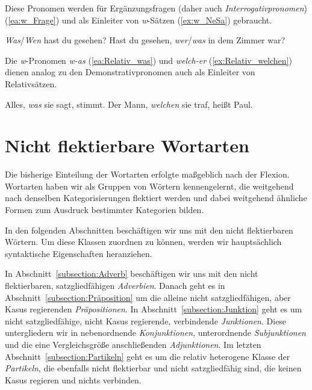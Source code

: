 Diese Pronomen werden für Ergänzungsfragen (daher auch \textit{Interrogativpronomen}) (\ref{ea:w_Frage}) und als Einleiter von \textit{w}-Sätzen (\ref{ex:w_NeSa}) gebraucht.

\ea \label{ea:w_Frage_NeSa}
\ea \label{ea:w_Frage} \textit{Was}/\textit{Wen} hast du gesehen?
\ex \label{ex:w_NeSa} Hast du gesehen, \textit{wer}/\textit{was} in dem Zimmer war?
\z 
\z 

Die \textit{w}-Pronomen \textit{w-as} (\ref{ea:Relativ_was}) und \textit{welch-er} (\ref{ex:Relativ_welchen}) dienen analog zu den Demonstrativpronomen auch als Einleiter von Relativsätzen. 

\ea \label{ea:Relativ_w_d}
\ea \label{ea:Relativ_was} Alles, \textit{was} sie sagt, stimmt.
\ex \label{ex:Relativ_welchen} Der Mann, \textit{welchen} sie traf, heißt Paul.
\z 
\z 



\section{Nicht flektierbare Wortarten}\label{section:Nicht flektierbar}

Die bisherige Einteilung der Wortarten erfolgte maßgeblich nach der Flexion. Wortarten haben wir als Gruppen von Wörtern kennengelernt, die weitgehend nach denselben Kategorisierungen flektiert werden und dabei weitgehend ähnliche Formen zum Ausdruck bestimmter Kategorien bilden.

In den folgenden Abschnitten beschäftigen wir uns mit den nicht flektierbaren Wörtern. Um diese Klassen zuordnen zu können, werden wir hauptsächlich syntaktische Eigenschaften heranziehen. 

In Abschnitt~\ref{subsection:Adverb} beschäftigen wir uns mit den nicht flektierbaren, satzgliedfähigen \textit{Adverbien}. Danach geht es in Abschnitt~\ref{subsection:Präposition} um die alleine nicht satzgliedfähigen, aber Kasus regierenden \textit{Präpositionen}. In Abschnitt~\ref{subsection:Junktion} geht es um nicht satzgliedfähige, nicht Kasus regierende, verbindende \textit{Junktionen}. Diese untergliedern wir in nebenordnende \textit{Konjunktionen}, unterordnende \textit{Subjunktionen} und die eine Vergleichsgröße anschließenden \textit{Adjunktionen}. Im letzten Abschnitt~\ref{subsection:Partikeln} geht es um die relativ heterogene Klasse der \textit{Partikeln}, die ebenfalls nicht flektierbar und nicht satzgliedfähig sind, die keinen Kasus regieren und nichts verbinden. 



